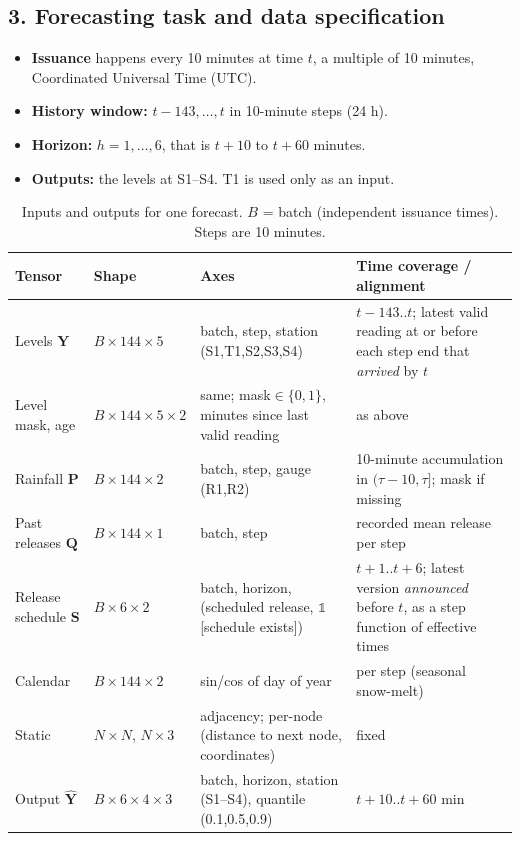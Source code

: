 \documentclass[11pt]{article}
\begin{document}
\subsection*{3. Forecasting task and data specification}

\begin{itemize}
\item \textbf{Issuance} happens every 10 minutes at time $t$, a multiple of 10 minutes, Coordinated Universal Time (UTC).
\item \textbf{History window:} $t-143,\dots,t$ in 10-minute steps (24 h).
\item \textbf{Horizon:} $h=1,\dots,6$, that is $t{+}10$ to $t{+}60$ minutes.
\item \textbf{Outputs:} the levels at S1--S4. T1 is used only as an input.
\end{itemize}

\begin{table}[H]
\centering\small
\caption{Inputs and outputs for one forecast. $B$ = batch (independent issuance times). Steps are 10 minutes.}
\label{tab:q1io}
\begin{tabularx}{\linewidth}{@{}l l Y Y@{}}
\toprule
Tensor & Shape & Axes & Time coverage / alignment\\
\midrule
Levels $\mathbf{Y}$ & $B\times144\times5$ & batch, step, station (S1,T1,S2,S3,S4) & $t{-}143..t$; latest valid reading at or before each step end that \emph{arrived} by $t$\\
Level mask, age & $B\times144\times5\times2$ & same; mask$\in\{0,1\}$, minutes since last valid reading & as above\\
Rainfall $\mathbf{P}$ & $B\times144\times2$ & batch, step, gauge (R1,R2) & 10-minute accumulation in $(\tau{-}10,\tau]$; mask if missing\\
Past releases $\mathbf{Q}$ & $B\times144\times1$ & batch, step & recorded mean release per step\\
Release schedule $\mathbf{S}$ & $B\times6\times2$ & batch, horizon, (scheduled release, $\mathbb{1}$[schedule exists]) & $t{+}1..t{+}6$; latest version \emph{announced} before $t$, as a step function of effective times\\
Calendar & $B\times144\times2$ & sin/cos of day of year & per step (seasonal snow-melt)\\
Static & $N\times N$, $N\times3$ & adjacency; per-node (distance to next node, coordinates) & fixed\\
\midrule
Output $\hat{\mathbf{Y}}$ & $B\times6\times4\times3$ & batch, horizon, station (S1--S4), quantile (0.1,0.5,0.9) & $t{+}10..t{+}60$ min\\
\bottomrule
\end{tabularx}
\end{table}
\end{document}
